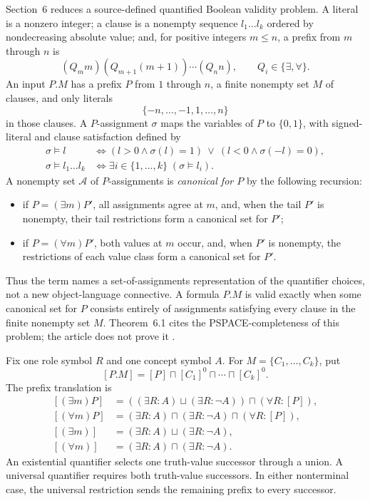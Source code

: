 Section~6 reduces a source-defined quantified Boolean validity problem.  A
literal is a nonzero integer; a clause is a nonempty sequence
\(l_1\ldots l_k\) ordered by nondecreasing absolute value; and, for positive
integers \(m\le n\), a prefix from \(m\) through \(n\) is
\[
 (Q_m m)(Q_{m+1}(m+1))\cdots(Q_n n),
 \qquad Q_i\in\{\exists,\forall\}.
\]
An input \(P.M\) has a prefix \(P\) from \(1\) through \(n\), a finite
nonempty set \(M\) of clauses, and only literals
\[
 \{-n,\ldots,-1,1,\ldots,n\}
\]
in those clauses.  A \(P\)-assignment \(\sigma\) maps the variables of \(P\)
to \(\{0,1\}\), with signed-literal and clause satisfaction defined by
\[
\begin{aligned}
 \sigma\models l
 &\iff
   (l>0\land\sigma(l)=1)
   \ \lor\
   (l<0\land\sigma(-l)=0),\\
 \sigma\models l_1\ldots l_k
 &\iff
   \exists i\in\{1,\ldots,k\}\;(\sigma\models l_i).
\end{aligned}
\]
A nonempty
set \(\mathcal A\) of \(P\)-assignments is \emph{canonical for \(P\)} by the
following recursion:
\begin{itemize}
\item if \(P=(\exists m)P'\), all assignments agree at \(m\), and, when the
      tail \(P'\) is nonempty, their tail restrictions form a canonical set
      for \(P'\);
\item if \(P=(\forall m)P'\), both values at \(m\) occur, and, when \(P'\) is
      nonempty, the restrictions of each value class form a canonical set for
      \(P'\).
\end{itemize}
Thus the term names a set-of-assignments representation of the quantifier
choices, not a new object-language connective.  A formula \(P.M\) is valid
exactly when some canonical set for \(P\) consists entirely of assignments
satisfying every clause in the finite nonempty set \(M\).  Theorem~6.1 cites
the PSPACE-completeness of this problem; the article does not prove it
\cite[\S6.1, p.~18]{SchmidtSchaussSmolka1991}.

Fix one role symbol \(R\) and one concept symbol \(A\).  For
\(M=\{C_1,\ldots,C_k\}\), put
\[
 [P.M]=[P]\sqcap[C_1]^0\sqcap\cdots\sqcap[C_k]^0.
\]
The prefix translation is
\[
\begin{aligned}
 [(\exists m)P]
   &=((\exists R:A)\sqcup(\exists R:\neg A))
      \sqcap(\forall R:[P]),\\
 [(\forall m)P]
   &=(\exists R:A)\sqcap(\exists R:\neg A)
      \sqcap(\forall R:[P]),\\
 [(\exists m)]
   &=(\exists R:A)\sqcup(\exists R:\neg A),\\
 [(\forall m)]
   &=(\exists R:A)\sqcap(\exists R:\neg A).
\end{aligned}
\]
An existential quantifier selects one truth-value successor through a union.
A universal quantifier requires both truth-value successors.  In either
nonterminal case, the universal restriction sends the remaining prefix to
every successor.

